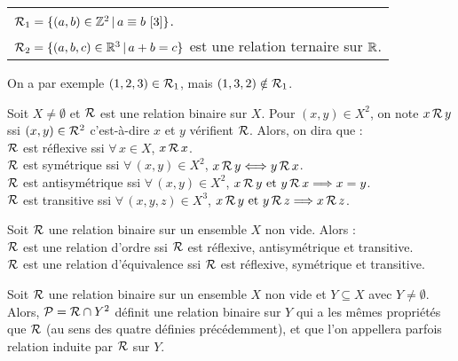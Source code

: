 			\begin{Exemples}
				\begin{tabular}[t]{l}
					\bdot \(\cal{R}_1 = \{(a,b) \in \bb{Z}^2 \,|\, a \equiv b \ [3]\}\). \\
					\bdot \(\cal{R}_2 = \{(a,b,c) \in \bb{R}^3 \,|\, a+b = c\}\) est une relation ternaire sur \(\bb{R}\).
				\end{tabular} \nt
					On a par exemple \((1,2,3) \in \cal{R}_1\), mais \((1,3,2) \notin \cal{R}_1\).
			\end{Exemples}
		
			\begin{Definitions}
				Soit \(X \neq \emptyset\) et \(\cal{R}\) est une relation binaire sur \(X\). Pour \((x,y) \in X^2\), on note \(x \,\cal{R}\, y\) ssi \((x,y) \in \cal{R}^2\) c'est-à-dire \(x\) et \(y\) vérifient \(\cal{R}\). Alors, on dira que : \\
					 \bdot \(\cal{R}\) est réflexive ssi \(\forall \,x \in X\), \(x \,\cal{R}\, x\). \\
					 \bdot \(\cal{R}\) est symétrique ssi \(\forall \,(x,y) \in X^2\), \(x \,\cal{R}\, y \iff y \,\cal{R}\, x\). \\
					 \bdot \(\cal{R}\) est antisymétrique ssi \(\forall \,(x,y) \in X^2\), \(x \,\cal{R}\, y \text{ et } y \,\cal{R}\, x \Longrightarrow x = y\). \\
					 \bdot \(\cal{R}\) est transitive ssi \(\forall \,(x,y,z) \in X^3\), \(x \,\cal{R}\, y \text{ et } y \,\cal{R}\, z \Longrightarrow x \,\cal{R}\, z\).
			\end{Definitions}
		
			\begin{Definitions}
				Soit \(\cal{R}\) une relation binaire sur un ensemble \(X\) non vide. Alors : \\
					 \bdot \(\cal{R}\) est une relation d'ordre ssi \(\cal{R}\) est réflexive, antisymétrique et transitive. \\
					 \bdot \(\cal{R}\) est une relation d'équivalence ssi \(\cal{R}\) est réflexive, symétrique et transitive.
			\end{Definitions}
		
			\begin{Definition}
				Soit \(\cal{R}\) une relation binaire sur un ensemble \(X\) non vide et \(Y \subseteq X\) avec \(Y \neq \emptyset\). Alors, \(\cal{P} = \cal{R} \cap Y^2\) définit une relation binaire sur \(Y\) qui a les mêmes propriétés que \(\cal{R}\) (au sens des quatre définies précédemment), et que l'on appellera parfois relation induite par \(\cal{R}\) sur \(Y\).
			\end{Definition}
		

